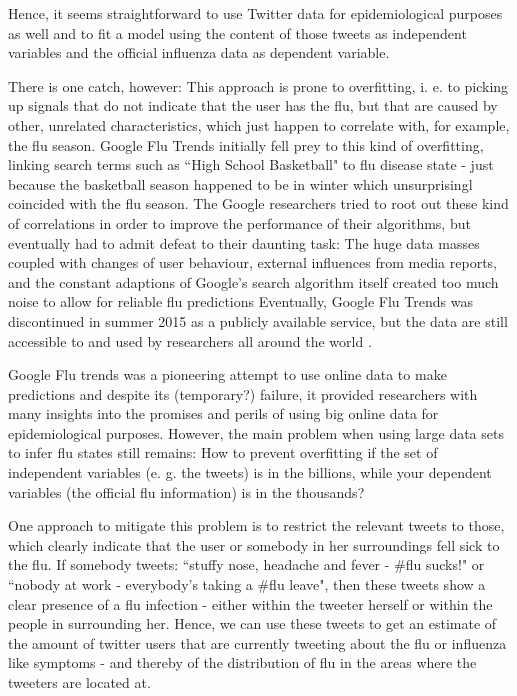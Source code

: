 \documentclass[11pt, a4paper,twoside]{report}\usepackage[]{graphicx}\usepackage[]{color}
\begin{document}
Hence, it seems straightforward to use Twitter data for epidemiological purposes as well and to fit a model using the content of those tweets as independent variables and the official influenza data as dependent variable.

There is one catch, however: This approach is prone to overfitting, i. e. to picking up signals that do not indicate that the user has the flu, but that are caused by other, unrelated characteristics, which just happen to correlate with, for example, the flu season. Google Flu Trends \citep{ginsberg_detecting_2009} initially fell prey to this kind of overfitting, linking search terms such as ``High School Basketball" to flu disease state - just because the basketball season happened to be in winter which unsurprisingl coincided with the flu season. The Google researchers tried to root out these kind of correlations in order to improve the performance of their algorithms, but eventually had to admit defeat to their daunting task: The huge data masses coupled with changes of user behaviour, external influences from media reports, and the constant adaptions of Google's search algorithm itself created too much noise to allow for reliable flu predictions \citep{olson_reassessing_2013,butler_when_2013,lazer_parable_2014} Eventually, Google Flu Trends was discontinued in summer 2015 as a publicly available service, but the data are still accessible to and used by researchers all around the world \citep{GFT_nextchapter_2015}.

Google Flu trends was a pioneering attempt to use online data to make predictions and despite its (temporary?) failure, it provided researchers with many insights into the promises and perils of using big online data for epidemiological purposes. However, the main problem when using large data sets to infer flu states still remains: How to prevent overfitting if the set of independent variables (e. g. the tweets) is in the billions, while your dependent variables (the official flu information) is in the thousands?

One approach to mitigate this problem is to restrict the relevant tweets to those, which clearly indicate that the user or somebody in her surroundings fell sick to the flu. If somebody tweets: ``stuffy nose, headache and fever - \#flu sucks!" or ``nobody at work - everybody's taking a \#flu leave", then these tweets show a clear presence of a flu infection - either within the tweeter herself or within the people in surrounding her. Hence, we can use these tweets to get an estimate of the amount of twitter users that are currently tweeting about the flu or influenza like symptoms - and thereby of the distribution of flu in the areas where the tweeters are located at.
\end{document}
